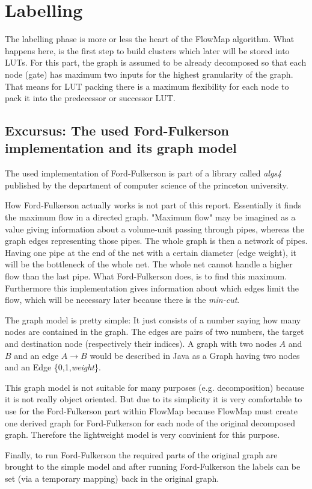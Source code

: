 \chapter{Labelling}
The labelling phase is more or less the heart of the FlowMap algorithm. What happens here, is the first step to build clusters which later will be stored into LUTs. For this part, the graph is assumed to be already decomposed so that each node (gate) has maximum two inputs for the highest granularity of the graph. That means for LUT packing there is a maximum flexibility for each node to pack it into the predecessor or successor LUT.

\section{Excursus: The used Ford-Fulkerson implementation and its graph model}
The used implementation of Ford-Fulkerson is part of a library called \textit{algs4} published by the department of computer science of the princeton university.
\par
How Ford-Fulkerson actually works is not part of this report. Essentially it finds the maximum flow in a directed graph. "Maximum flow" may be imagined as a value giving information about a volume-unit passing through pipes, whereas the graph edges representing those pipes. The whole graph is then a network of pipes. Having one pipe at the end of the net with a certain diameter (edge weight), it will be the bottleneck of the whole net. The whole net cannot handle a higher flow than the last pipe. What Ford-Fulkerson does, is to find this maximum. Furthermore this implementation gives information about which edges limit the flow, which will be necessary later because there is the \textit{min-cut}.
\par
The graph model is pretty simple: It just consists of a number saying how many nodes are contained in the graph. The edges are pairs of two numbers, the target and destination node (respectively their indices). A graph with two nodes $A$ and $B$ and an edge $A\rightarrow B$ would be described in Java as a Graph having two nodes and an Edge \{0,1,\textit{weight}\}.
\par
This graph model is not suitable for many purposes (e.g. decomposition) because it is not really object oriented. But due to its simplicity it is very comfortable to use for the Ford-Fulkerson part within FlowMap because FlowMap must create one derived graph for Ford-Fulkerson for each node of the original decomposed graph. Therefore the lightweight model is very convinient for this purpose.
\par
Finally, to run Ford-Fulkerson the required parts of the original graph are brought to the simple model and after running Ford-Fulkerson the labels can be set (via a temporary mapping) back in the original graph.

